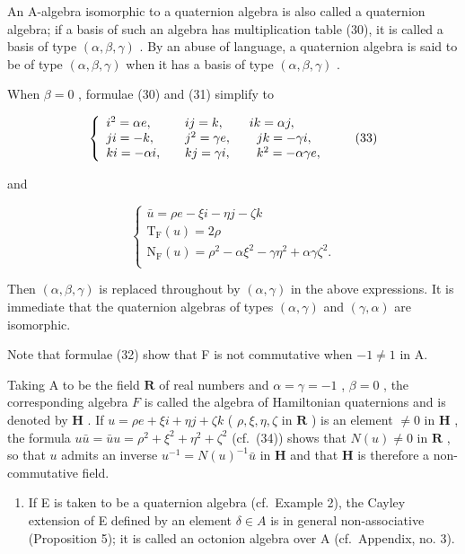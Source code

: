 An A-algebra isomorphic to a quaternion algebra is also called a quaternion algebra; if a basis of such an algebra has multiplication table (30), it is called a basis of type \((\alpha, \beta, \gamma)\) . By an abuse of language, a quaternion algebra is said to be of type \((\alpha, \beta, \gamma)\) when it has a basis of type \((\alpha, \beta, \gamma)\) .

When \(\beta = 0\) , formulae (30) and (31) simplify to

\[
\left\{ \begin{array}{l l} i ^ {2} = \alpha e, & \quad i j = k, \qquad i k = \alpha j, \\ j i = - k, & \quad j ^ {2} = \gamma e, \qquad j k = - \gamma i, \\ k i = - \alpha i, & \quad k j = \gamma i, \qquad k ^ {2} = - \alpha \gamma e, \end{array} \right.\tag{33}
\]

and

\[
\left\{ \begin{array} {c}\bar {u} = \rho e - \xi i - \eta j - \zeta k \\ \mathrm{T} _ {\mathrm{F}} (u) = 2 \rho \\ \mathrm{N} _ {\mathrm{F}} (u) = \rho^ {2} - \alpha \xi^ {2} - \gamma \eta^ {2} + \alpha \gamma \zeta^ {2}. \\ \end{array} \right.\tag{34}
\]

Then \((\alpha, \beta, \gamma)\) is replaced throughout by \((\alpha, \gamma)\) in the above expressions. It is immediate that the quaternion algebras of types \((\alpha, \gamma)\) and \((\gamma, \alpha)\) are isomorphic.

Note that formulae (32) show that F is not commutative when \(-1 \neq 1\) in A.

Taking A to be the field \(\mathbf{R}\) of real numbers and \(\alpha = \gamma = -1\) , \(\beta = 0\) , the corresponding algebra \(F\) is called the algebra of Hamiltonian quaternions and is denoted by \(\mathbf{H}\) . If \(u = \rho e + \xi i + \eta j + \zeta k\) ( \(\rho, \xi, \eta, \zeta\) in \(\mathbf{R}\) ) is an element \(\neq 0\) in \(\mathbf{H}\) , the formula \(u\bar{u} = \bar{u} u = \rho^2 + \xi^2 + \eta^2 + \zeta^2\) (cf.~(34)) shows that \(N(u) \neq 0\) in \(\mathbf{R}\) , so that \(u\) admits an inverse \(u^{-1} = N(u)^{-1}\bar{u}\) in \(\mathbf{H}\) and that \(\mathbf{H}\) is therefore a non-commutative field.

\begin{enumerate}
\def\labelenumi{(\arabic{enumi})}
\setcounter{enumi}{2}
\tightlist
\item
  If E is taken to be a quaternion algebra (cf.~Example 2), the Cayley extension of E defined by an element \(\delta \in A\) is in general non-associative (Proposition 5); it is called an octonion algebra over A (cf.~Appendix, no. 3).
\end{enumerate}

